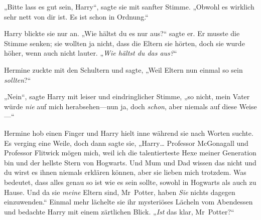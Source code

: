 „Bitte lass es gut sein, Harry“, sagte sie mit sanfter Stimme. „Obwohl es wirklich sehr nett von dir ist. Es ist schon in Ordnung.“

Harry blickte sie nur an. „Wie hältst du es nur aus?“ sagte er. Er musste die Stimme senken; sie wollten ja nicht, dass die Eltern sie hörten, doch sie wurde höher, wenn auch nicht lauter. „\emph{Wie hältst du das aus?}“

Hermine zuckte mit den Schultern und sagte, „Weil Eltern nun einmal so sein \emph{sollten}?“

„Nein“, sagte Harry mit leiser und eindringlicher Stimme, „so nicht, mein Vater würde \emph{nie} auf mich herabsehen—nun ja, doch \emph{schon}, aber niemals auf diese Weise—“

Hermine hob einen Finger und Harry hielt inne während sie nach Worten suchte. Es verging eine Weile, doch dann sagte sie, „Harry… Professor McGonagall und Professor Flitwick mögen mich, weil ich die talentierteste Hexe meiner Generation bin und der hellste Stern von Hogwarts. Und Mum und Dad wissen das nicht und du wirst es ihnen niemals erklären können, aber sie lieben mich trotzdem. Was bedeutet, dass alles genau so ist wie es sein sollte, sowohl in Hogwarts als auch zu Hause. Und da sie \emph{meine} Eltern sind, Mr~Potter, haben \emph{Sie} nichts dagegen einzuwenden.“ Einmal mehr lächelte sie ihr mysteriöses Lächeln vom Abendessen und bedachte Harry mit einem zärtlichen Blick. „\emph{Ist} das klar, Mr~Potter?“

